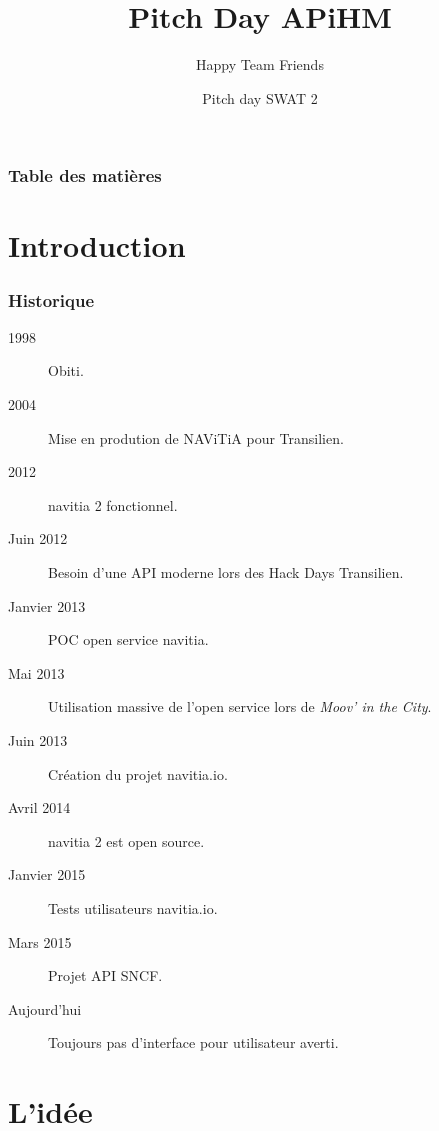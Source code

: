\documentclass[table]{beamer}
\title{Pitch Day APiHM}
\author{Happy Team Friends}
\institute[Kisio Digital] %
{
  Kisio Digital\\
  20 rue Hector Malot\\
  75012 Paris, France}
\date{Pitch day SWAT 2}
\begin{document}
\begin{frame}
  \titlepage    
\end{frame}

\begin{frame}%
  \frametitle{Table des matières}
  \tableofcontents[hideallsubsections]
\end{frame}

\section{Introduction}

\begin{frame}
  \frametitle{Historique}

  \begin{description}
  \item[1998] Obiti.
  \item[2004] Mise en prodution de NAViTiA pour Transilien.
  \item[2012] navitia 2 fonctionnel.
  \item[Juin 2012] Besoin d'une API moderne lors des Hack Days Transilien.
  \item[Janvier 2013] POC open service navitia.
  \item[Mai 2013] Utilisation massive de l'open service lors de
    \emph{Moov' in the City}.
  \item[Juin 2013] Création du projet navitia.io.
  \item[Avril 2014] navitia 2 est open source.
  \item[Janvier 2015] Tests utilisateurs navitia.io.
  \item[Mars 2015] Projet API SNCF.\pause
  \item[Aujourd'hui] Toujours pas d'interface pour utilisateur averti.
  \end{description}
\end{frame}

\section{L'idée}

\end{document}
